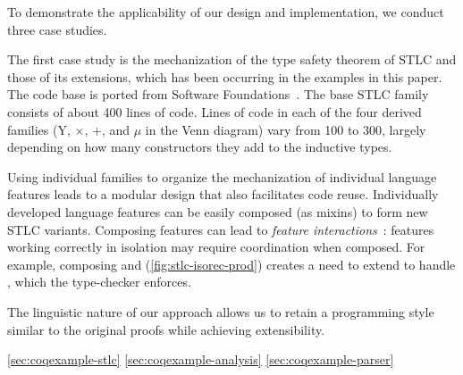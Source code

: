 To demonstrate the applicability of our design and implementation, we
conduct three case studies.



The first case study is the mechanization of the type safety theorem of
STLC and those of its extensions,
which has been occurring in the examples in this paper.
The code base is ported from Software Foundations~\cite{sf-pl}.
%
The base STLC family consists of about 400 lines of code.
Lines of code in each of the four derived families
($\mathrm{Y}$, $\times$, $+$, and $\mu$ in the Venn diagram)
vary from 100 to 300, largely depending on how many constructors they
add to the inductive types.



Using individual families to organize the mechanization of individual
language features leads to a modular design that also facilitates code reuse.
%
Individually developed language features can be easily composed (as
mixins) to form new STLC variants.
%
Composing features can lead to \emph{feature interactions}~\cite{batory2011feature}:
features working correctly in isolation may require coordination when composed.
For example, composing  and 
(\cref{fig:stlc-isorec-prod}) creates a need to extend  to
handle , which the type-checker enforces.

The linguistic nature of our approach allows us to retain a programming
style similar to the original proofs while achieving extensibility.

\bigskip 

\cref{sec:coqexample-stlc}
\cref{sec:coqexample-analysis}
\cref{sec:coqexample-parser}